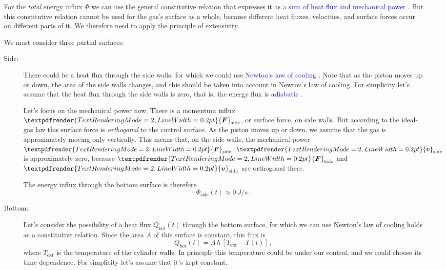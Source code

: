 \documentclass[a4paper,12pt,%
onecolumn,oneside,%
british%
]{memoir}
\renewcommand*{\bm}[1]{\textpdfrender{TextRenderingMode=2,LineWidth=0.2pt}{\boldsymbol{#1}}}
\renewcommand*{\|}[1][]{\nonscript\:#1\vert\nonscript\:\mathopen{}}
\newcommand*{\sect}{\S}%
\renewcommand*{\autoref}[3][\sect\,\ref]{\textcolor{blue}{#3}
\raisebox{0.6ex}{\color{blue}\miniscule%
\faIcon{angle-right}%
\;#1{#2}\;p.\,\pageref{#2}}}
\newcommand*{\yhea}{h} %
\newcommand*{\yv}{\bm{v}}
\newcommand*{\yH}{\varPhi}%
\newcommand*{\yQ}{Q}%
\newcommand*{\yF}{\bm{F}}
\newcommand*{\yT}{T}%
\newcommand*{\yTe}{\yT_{\text{ext}}}%
\begin{document}
\medskip

For the \emph{total} energy influx $\yH$ we can use the general constitutive relation that expresses it as a \autoref{def:heatflux_mechpower}{sum of heat flux and mechanical power}. But this constitutive relation cannot be used for the gas's surface as a whole, because different heat fluxes, velocities, and surface forces occur on different parts of it. We therefore need to apply the principle of extensivity.

We must consider three partial surfaces:
\begin{description}
\item[Side:] There could be a heat flux through the side walls, for which we could use \autoref{def:newton_cooling}{Newton's law of cooling}. Note that as the piston moves up or down, the area of the side walls changes, and this should be taken into account in Newton's law of cooling. For simplicity let's assume that the heat flux through the side walls is zero, that is, the energy flux is \autoref{def:heatflux_mechpower}{adiabatic}.

  Let's focus on the mechanical power now. There is a momentum influx $\yF_{\text{side}}$, or surface force, on side walls. But according to the ideal-gas law this surface force is \emph{orthogonal} to the control surface. As the piston moves up or down, we assume that the gas is approximately moving only vertically. This means that, on the side walls, the mechanical power $\yF_{\text{side}}\cdot\yv_{\text{side}}$ is approximately zero, because $\yF_{\text{side}}$ and $\yv_{\text{side}}$ are orthogonal there.

    The energy influx through the bottom surface is therefore
  \begin{equation*}
    \yH_{\text{side}}(t) \approx \qty{0}{J/s} \,.
  \end{equation*}
  
\item[Bottom:] Let's consider the possibility of a heat flux $\yQ_{\textrm{bot}}(t)$ through the bottom surface, for which we can use Newton's law of cooling holds as a constitutive relation. Since the area $A$ of this surface is constant, this flux is
  \begin{equation*}
    \yQ_{\textrm{bot}}(t) = A\,\yhea\,[\yTe-\yT(t)] \,,
  \end{equation*}
  where $\yTe$ is the temperature of the cylinder walls. In principle this temperature could be under our control, and we could choose its time dependence. For simplicity let's assume that it's kept constant.


\end{description}
\end{document}
